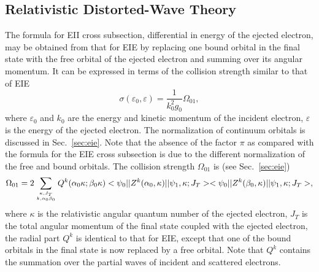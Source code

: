 \subsection{Relativistic Distorted-Wave Theory}
The formula for EII cross subsection, differential in energy of the ejected
electron, may be obtained from that for EIE by replacing one bound orbital in
the final state with the free orbital of the ejected electron and summing 
over its angular momentum. It can be expressed in terms of the collision
strength similar to that of EIE 
\begin{equation}
\label{eq_cross}
\sigma(\varepsilon_0,\varepsilon) = \frac{1}{k_0^2g_0}\Omega_{01},
\end{equation}
where $\varepsilon_0$ and $k_0$ are the energy and kinetic momentum of the
incident electron, $\varepsilon$ is the energy of the ejected electron. The
normalization of continuum orbitals is discussed in Sec.~\ref{sec:eie}. Note
that the absence of the 
factor $\pi$ as compared with the formula for the EIE cross subsection is due to
the different normalization of the free and bound orbitals. The collision
strength $\Omega_{01}$ is (see Sec.~\ref{sec:eie})
\begin{equation}
\label{eq_cs2}
\Omega_{01} = 2\sum_{\kappa,J_T\atop k,\alpha_0\beta_0}
Q^k(\alpha_0\kappa;\beta_0\kappa)
<\psi_0||Z^k(\alpha_0,\kappa)||\psi_1,\kappa;J_T>
<\psi_0||Z^k(\beta_0,\kappa)||\psi_1,\kappa;J_T>,
\end{equation}
where $\kappa$ is the relativistic angular quantum number of the ejected
electron, $J_T$ is the total angular momentum of the final state coupled with
the ejected electron,
the radial part $Q^k$ is identical to that for EIE, except that one of
the bound orbitals in the final state is now replaced by a free orbital. Note
that $Q^k$ contains the summation over the partial waves of incident and
scattered electrons.

